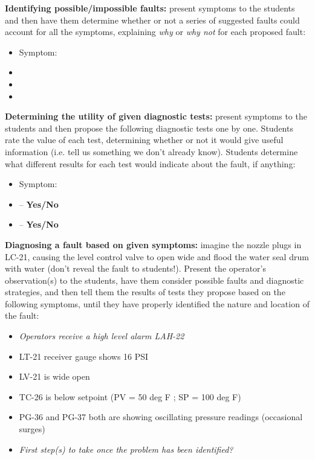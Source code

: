 \noindent
{\bf Identifying possible/impossible faults:} present symptoms to the students and then have them determine whether or not a series of suggested faults could account for all the symptoms, explaining {\it why} or {\it why not} for each proposed fault:

\begin{itemize}
\item{} Symptom: {\it }
\item{} 
\item{} 
\item{} 
\end{itemize}


\vskip 10pt


\noindent
{\bf Determining the utility of given diagnostic tests:} present symptoms to the students and then propose the following diagnostic tests one by one.  Students rate the value of each test, determining whether or not it would give useful information (i.e. tell us something we don't already know).  Students determine what different results for each test would indicate about the fault, if anything:

\begin{itemize}
\item{} Symptom: {\it }
\item{}  -- {\bf Yes/No}
\item{}  -- {\bf Yes/No}
\end{itemize}


\vskip 10pt


\noindent
{\bf Diagnosing a fault based on given symptoms:} imagine the nozzle plugs in LC-21, causing the level control valve to open wide and flood the water seal drum with water (don't reveal the fault to students!).  Present the operator's observation(s) to the students, have them consider possible faults and diagnostic strategies, and then tell them the results of tests they propose based on the following symptoms, until they have properly identified the nature and location of the fault:

\begin{itemize}
\item{} {\it Operators receive a high level alarm LAH-22}
\item{} LT-21 receiver gauge shows 16 PSI
\item{} LV-21 is wide open
\item{} TC-26 is below setpoint (PV = 50 deg F ; SP = 100 deg F)
\item{} PG-36 and PG-37 both are showing oscillating pressure readings (occasional surges)
\item{} {\it First step(s) to take once the problem has been identified?}
\end{itemize}





